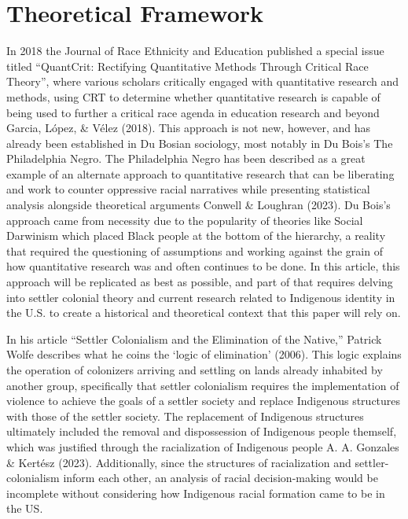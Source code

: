 \documentclass[
  12pt,
  letterpaper,
]{article}
\begin{document}
\hypertarget{theoretical-framework}{%
\section{Theoretical Framework}\label{theoretical-framework}}

In 2018 the Journal of Race Ethnicity and Education published a special
issue titled ``QuantCrit: Rectifying Quantitative Methods Through
Critical Race Theory'', where various scholars critically engaged with
quantitative research and methods, using CRT to determine whether
quantitative research is capable of being used to further a critical
race agenda in education research and beyond Garcia, López, \& Vélez
(2018). This approach is not new, however, and has already been
established in Du Bosian sociology, most notably in Du Bois's The
Philadelphia Negro. The Philadelphia Negro has been described as a great
example of an alternate approach to quantitative research that can be
liberating and work to counter oppressive racial narratives while
presenting statistical analysis alongside theoretical arguments Conwell
\& Loughran (2023). Du Bois's approach came from necessity due to the
popularity of theories like Social Darwinism which placed Black people
at the bottom of the hierarchy, a reality that required the questioning
of assumptions and working against the grain of how quantitative
research was and often continues to be done. In this article, this
approach will be replicated as best as possible, and part of that
requires delving into settler colonial theory and current research
related to Indigenous identity in the U.S. to create a historical and
theoretical context that this paper will rely on.

In his article ``Settler Colonialism and the Elimination of the
Native,'' Patrick Wolfe describes what he coins the `logic of
elimination' (2006). This logic explains the operation of colonizers
arriving and settling on lands already inhabited by another group,
specifically that settler colonialism requires the implementation of
violence to achieve the goals of a settler society and replace
Indigenous structures with those of the settler society. The replacement
of Indigenous structures ultimately included the removal and
dispossession of Indigenous people themself, which was justified through
the racialization of Indigenous people A. A. Gonzales \& Kertész (2023).
Additionally, since the structures of racialization and
settler-colonialism inform each other, an analysis of racial
decision-making would be incomplete without considering how Indigenous
racial formation came to be in the US.
\end{document}
